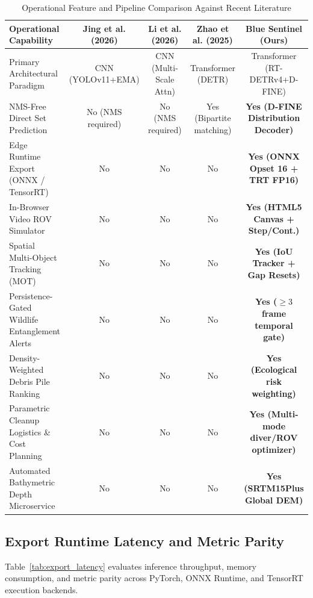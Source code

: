 \documentclass[conference]{IEEEtran}
\begin{document}
\begin{table}[t]
\caption{Operational Feature and Pipeline Comparison Against Recent Literature}
\label{tab:feature_comparison}
\centering
\begin{tabular}{lcccc}
\toprule
\textbf{Operational Capability} & \textbf{Jing et al. (2026) \cite{yolo11_base}} & \textbf{Li et al. (2026) \cite{li2026}} & \textbf{Zhao et al. (2025) \cite{zhao2025}} & \textbf{Blue Sentinel (Ours)} \\
\midrule
Primary Architectural Paradigm & CNN (YOLOv11+EMA) & CNN (Multi-Scale Attn) & Transformer (DETR) & Transformer (RT-DETRv4+D-FINE) \\
NMS-Free Direct Set Prediction & No (NMS required) & No (NMS required) & Yes (Bipartite matching) & \textbf{Yes (D-FINE Distribution Decoder)} \\
Edge Runtime Export (ONNX / TensorRT) & No & No & No & \textbf{Yes (ONNX Opset 16 + TRT FP16)} \\
In-Browser Video ROV Simulator & No & No & No & \textbf{Yes (HTML5 Canvas + Step/Cont.)} \\
Spatial Multi-Object Tracking (MOT) & No & No & No & \textbf{Yes (IoU Tracker + Gap Resets)} \\
Persistence-Gated Wildlife Entanglement Alerts & No & No & No & \textbf{Yes ($\ge 3$ frame temporal gate)} \\
Density-Weighted Debris Pile Ranking & No & No & No & \textbf{Yes (Ecological risk weighting)} \\
Parametric Cleanup Logistics \& Cost Planning & No & No & No & \textbf{Yes (Multi-mode diver/ROV optimizer)} \\
Automated Bathymetric Depth Microservice & No & No & No & \textbf{Yes (SRTM15Plus Global DEM)} \\
\bottomrule
\end{tabular}
\end{table}

\subsection{Export Runtime Latency and Metric Parity}
Table~\ref{tab:export_latency} evaluates inference throughput, memory consumption, and metric parity across PyTorch, ONNX Runtime, and TensorRT execution backends.
\end{document}
